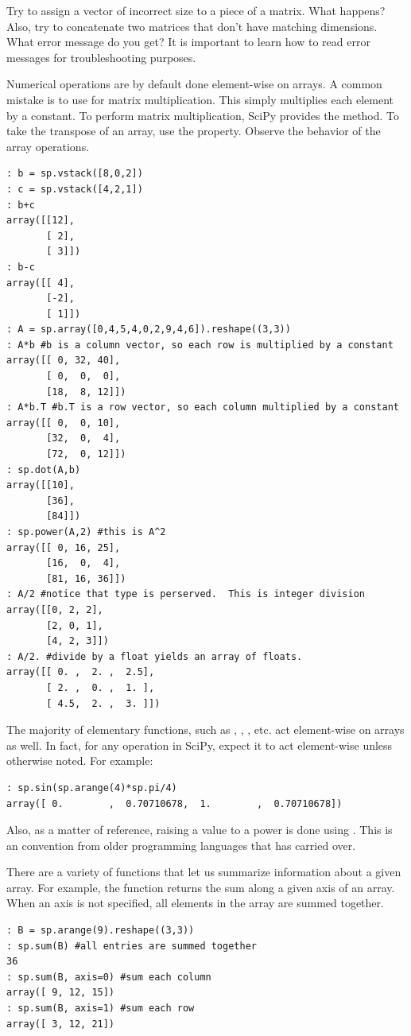 \begin{problem}
Try to assign a vector of incorrect size to a piece of a matrix. What happens?
Also, try to concatenate two matrices that don't have matching dimensions. What
error message do you get? It is important to learn how to read error messages
for troubleshooting purposes.
\end{problem}

Numerical operations are by default done element-wise on arrays.  A common
mistake is to use \li{*} for matrix multiplication.  This simply multiplies
each element by a constant.  To perform matrix multiplication, SciPy provides the  method.  To take the transpose of an array, use the  property.  Observe the behavior of the array operations.
\begin{lstlisting}
: b = sp.vstack([8,0,2])
: c = sp.vstack([4,2,1])
: b+c
array([[12],
       [ 2],
       [ 3]])
: b-c
array([[ 4],
       [-2],
       [ 1]])
: A = sp.array([0,4,5,4,0,2,9,4,6]).reshape((3,3))
: A*b #b is a column vector, so each row is multiplied by a constant
array([[ 0, 32, 40],
       [ 0,  0,  0],
       [18,  8, 12]])
: A*b.T #b.T is a row vector, so each column multiplied by a constant
array([[ 0,  0, 10],
       [32,  0,  4],
       [72,  0, 12]])
: sp.dot(A,b)
array([[10],
       [36],
       [84]])
: sp.power(A,2) #this is A^2
array([[ 0, 16, 25],
       [16,  0,  4],
       [81, 16, 36]])
: A/2 #notice that type is perserved.  This is integer division
array([[0, 2, 2],
       [2, 0, 1],
       [4, 2, 3]])
: A/2. #divide by a float yields an array of floats.
array([[ 0. ,  2. ,  2.5],
       [ 2. ,  0. ,  1. ],
       [ 4.5,  2. ,  3. ]])
\end{lstlisting}

The majority of elementary functions, such as , , , etc. act element-wise on arrays as well.  In fact, for any operation in SciPy, expect it to act element-wise unless otherwise noted.  For example:
\begin{lstlisting}
: sp.sin(sp.arange(4)*sp.pi/4)
array([ 0.        ,  0.70710678,  1.        ,  0.70710678])
\end{lstlisting}

Also, as a matter of reference, raising a value to a power is done using \li{**}. This is an convention from older programming languages that has carried over.

There are a variety of functions that let us summarize information about a given
array. For example, the  function returns the sum along a given axis of an array.  When an axis is not specified, all elements in the array are summed together.
\begin{lstlisting}
: B = sp.arange(9).reshape((3,3))
: sp.sum(B) #all entries are summed together
36
: sp.sum(B, axis=0) #sum each column
array([ 9, 12, 15])
: sp.sum(B, axis=1) #sum each row
array([ 3, 12, 21])     
\end{lstlisting}

